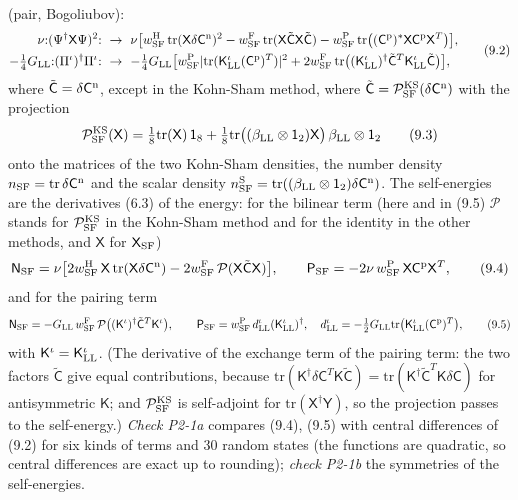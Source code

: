 \documentclass[
  10pt,
]{article}
\begin{document}
(pair, Bogoliubov):
\[\begin{aligned}\nu{:}(\Psi^\dagger\mathsf X\Psi)^2{:}\ &\to\ \nu\big[w^{\rm H}_{\rm SF}\,\mathrm{tr}(\mathsf X\delta\mathsf C^{\rm n})^2-w^{\rm F}_{\rm SF}\,\mathrm{tr}(\mathsf X\tilde{\mathsf C}\mathsf X\tilde{\mathsf C})-w^{\rm P}_{\rm SF}\,\mathrm{tr}\big((\mathsf C^{\rm p})^*\mathsf X\mathsf C^{\rm p}\mathsf X^T\big)\big],\\-\tfrac14G_{\rm LL}{:}(\Pi^\iota)^\dagger\Pi^\iota{:}\ &\to\ -\tfrac14G_{\rm LL}\big[w^{\rm P}_{\rm SF}\lvert\mathrm{tr}(\mathsf K^\iota_{\rm LL}(\mathsf C^{\rm p})^T)\rvert^2+2w^{\rm F}_{\rm SF}\,\mathrm{tr}\big((\mathsf K^\iota_{\rm LL})^\dagger\tilde{\mathsf C}^T\mathsf K^\iota_{\rm LL}\tilde{\mathsf C}\big)\big],\end{aligned}\tag{9.2}\]
where \(\tilde{\mathsf C}=\delta\mathsf C^{\rm n}\), except in the
Kohn-Sham method, where
\(\tilde{\mathsf C}=\mathcal P^{\rm KS}_{\rm SF}(\delta\mathsf C^{\rm n})\)
with the projection
\[\mathcal P^{\rm KS}_{\rm SF}(\mathsf X)=\tfrac18\mathrm{tr}(\mathsf X)\,\mathsf 1_8+\tfrac18\mathrm{tr}\big((\beta_{\rm LL}\otimes\mathsf 1_2)\mathsf X\big)\,\beta_{\rm LL}\otimes\mathsf 1_2\tag{9.3}\]
onto the matrices of the two Kohn-Sham densities, the number density
\(n_{\rm SF}=\mathrm{tr}\,\delta\mathsf C^{\rm n}\) and the scalar
density
\(n^{\rm S}_{\rm SF}=\mathrm{tr}((\beta_{\rm LL}\otimes\mathsf 1_2)\delta\mathsf C^{\rm n})\).
The self-energies are the derivatives (6.3) of the energy: for the
bilinear term (here and in (9.5) \(\mathcal P\) stands for
\(\mathcal P^{\rm KS}_{\rm SF}\) in the Kohn-Sham method and for the
identity in the other methods, and \(\mathsf X\) for
\(\mathsf X_{\rm SF}\))
\[\mathsf N_{\rm SF}=\nu\big[2w^{\rm H}_{\rm SF}\,\mathsf X\,\mathrm{tr}(\mathsf X\delta\mathsf C^{\rm n})-2w^{\rm F}_{\rm SF}\,\mathcal P(\mathsf X\tilde{\mathsf C}\mathsf X)\big],\qquad\mathsf P_{\rm SF}=-2\nu\,w^{\rm P}_{\rm SF}\,\mathsf X\mathsf C^{\rm p}\mathsf X^T,\tag{9.4}\]
and for the pairing term
\[\mathsf N_{\rm SF}=-G_{\rm LL}\,w^{\rm F}_{\rm SF}\,\mathcal P\big((\mathsf K^\iota)^\dagger\tilde{\mathsf C}^T\mathsf K^\iota\big),\qquad\mathsf P_{\rm SF}=w^{\rm P}_{\rm SF}\,d^\iota_{\rm LL}(\mathsf K^\iota_{\rm LL})^\dagger,\quad d^\iota_{\rm LL}=-\tfrac12G_{\rm LL}\mathrm{tr}\big(\mathsf K^\iota_{\rm LL}(\mathsf C^{\rm p})^T\big),\tag{9.5}\]
with \(\mathsf K^\iota=\mathsf K^\iota_{\rm LL}\). (The derivative of
the exchange term of the pairing term: the two factors
\(\tilde{\mathsf C}\) give equal contributions, because
\(\mathrm{tr}(\mathsf K^\dagger\delta\mathsf C^T\mathsf K\tilde{\mathsf C})=\mathrm{tr}(\mathsf K^\dagger\tilde{\mathsf C}^T\mathsf K\delta\mathsf C)\)
for antisymmetric \(\mathsf K\); and \(\mathcal P^{\rm KS}_{\rm SF}\) is
self-adjoint for \(\mathrm{tr}(\mathsf X^\dagger\mathsf Y)\), so the
projection passes to the self-energy.) \emph{Check P2-1a} compares
(9.4), (9.5) with central differences of (9.2) for six kinds of terms
and 30 random states (the functions are quadratic, so central
differences are exact up to rounding); \emph{check P2-1b} the symmetries
of the self-energies.
\end{document}
